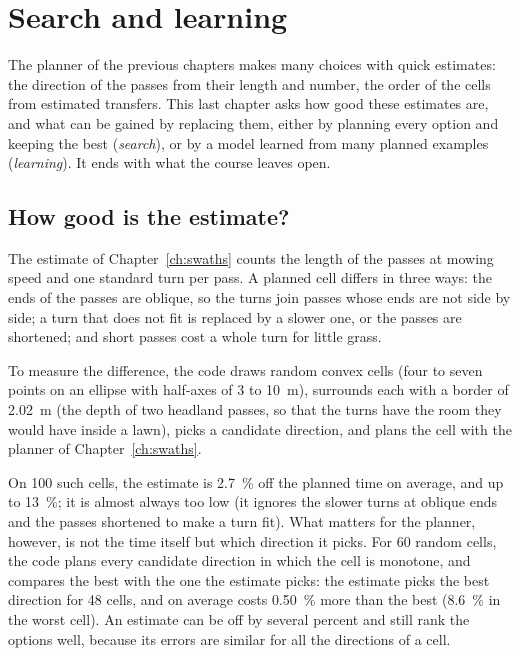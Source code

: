 \chapter{Search and learning}
\label{ch:search}

The planner of the previous chapters makes many choices with quick
estimates: the direction of the passes from their length and number, the
order of the cells from estimated transfers. This last chapter asks how
good these estimates are, and what can be gained by replacing them, either
by planning every option and keeping the best (\emph{search}), or by a model
learned from many planned examples (\emph{learning}). It ends with what the
course leaves open.

\section{How good is the estimate?}

The estimate of Chapter~\ref{ch:swaths} counts the length of the passes at
mowing speed and one standard turn per pass. A planned cell differs in
three ways: the ends of the passes are oblique, so the turns join passes
whose ends are not side by side; a turn that does not fit is replaced by a
slower one, or the passes are shortened; and short passes cost a whole
turn for little grass.

To measure the difference, the code draws random convex cells (four to
seven points on an ellipse with half-axes of 3 to \SI{10}{\metre}),
surrounds each with a border of \SI{2.02}{\metre} (the depth of two headland
passes, so that the turns have the room they would have inside a lawn),
picks a candidate direction, and plans the cell with the planner of
Chapter~\ref{ch:swaths}.

On 100 such cells, the estimate is \SI{2.7}{\percent} off the planned time
on average, and up to \SI{13}{\percent}; it is almost always too low (it
ignores the slower turns at oblique ends and the passes shortened to make a
turn fit). What matters for the planner, however, is not the time itself
but which direction it picks. For 60 random cells, the code plans every
candidate direction in which the cell is monotone, and compares the best
with the one the estimate picks: the estimate picks the best direction for
48 cells, and on average costs \SI{0.50}{\percent} more than the best
(\SI{8.6}{\percent} in the worst cell). An estimate can be off by several
percent and still rank the options well, because its errors are similar for
all the directions of a cell.

